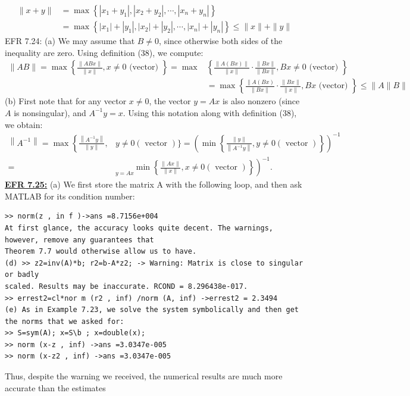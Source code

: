 \documentclass[../main.tex]{subfiles}
\begin{document}
$$
\begin{aligned}
\|x+y\| &=\max \left\{\left|x_{1}+y_{1}\right|,\left|x_{2}+y_{2}\right|, \cdots,\left|x_{n}+y_{n}\right|\right\} \\
&=\max \left\{\left|x_{1}\right|+\left|y_{1}\right|,\left|x_{2}\right|+\left|y_{2}\right|, \cdots,\left|x_{n}\right|+\left|y_{n}\right|\right\} \leq\|x\|+\|y\|
\end{aligned}
$$
EFR 7.24: (a) We may assume that $B \neq 0$, since otherwise both sides of the inequality are zero. Using definition (38), we compute:
$$
\begin{aligned}
\|A B\|=\max \left\{\frac{\|A B x\|}{\|x\|}, x \neq 0 \text { (vector) }\right\}=\max &\left\{\frac{\|A(B x)\|}{\|x\|} \cdot \frac{\|B x\|}{\|B x\|}, B x \neq 0 \text { (vector) }\right\} \\
&=\max \left\{\frac{\|A(B x)}{\|B x\|} \cdot \frac{\|Bx\|}{\|x\|}, B x \text { (vector) }\right\} \leq\|A\| B \|
\end{aligned}
$$
(b) First note that for any vector $x \neq 0$, the vector $y=A x$ is also nonzero (since $A$ is nonsingular), and $A^{-1} y=x$. Using this notation along with definition (38), we obtain:
$$
\begin{aligned}
\left\|A^{-1}\right\|=\max \left\{\frac{\left\|A^{-1} y\right\|}{\|y\|},\right.&y \neq 0(\text { vector })\}=\left(\min \left\{\frac{\|y\|}{\left\|A^{-1} y\right\|}, y \neq 0(\text { vector })\right\}\right)^{-1} \\
=&\left.\underset{y=A x}{ } \min \left\{\frac{\|A x\|}{\|x\|}, x \neq 0(\text { vector })\right\}\right)^{-1} .
\end{aligned}
$$
\textbf{\underline{EFR 7.25:}} (a) We first store the matrix A with the following loop, and then ask MATLAB for its condition number:
\begin{lstlisting}[numbers=none,frame=none]
>> norm(z , in f )->ans =8.7156e+004 
At first glance, the accuracy looks quite decent. The warnings, however, remove any guarantees that 
Theorem 7.7 would otherwise allow us to have. 
(d) >> z2=inv(A)*b; r2=b-A*z2; -> Warning: Matrix is close to singular or badly 
scaled. Results may be inaccurate. RCOND = 8.296438e-017. 
>> errest2=cl*nor m (r2 , inf) /norm (A, inf) ->errest2 = 2.3494 
(e) As in Example 7.23, we solve the system symbolically and then get the norms that we asked for: 
>> S=sym(A); x=S\b ; x=double(x); 
>> norm (x-z , inf) ->ans =3.0347e-005 
>> norm (x-z2 , inf) ->ans =3.0347e-005 
\end{lstlisting}
Thus, despite the warning we received, the numerical results are much more accurate than the estimates 
\end{document}
